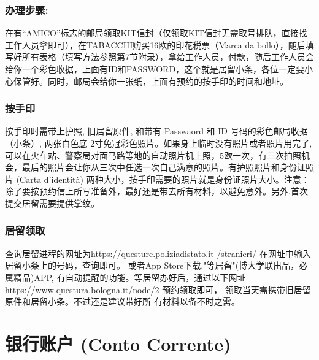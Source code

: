 \subsubsection{办理步骤:}
在有“AMICO”标志的邮局领取KIT信封（仅领取KIT信封无需取号排队，直接找工作人员拿即可），在TABACCHI购买16欧的印花税票（Marca da bollo），随后填写好所有表格（填写方法参照第7节附录），拿给工作人员，付款，随后工作人员会给你一个彩色收据，上面有ID和PASSWORD，这个就是居留小条，各位一定要小心保管好。同时，邮局会给你一张纸，上面有预约的按手印的时间和地址。


\subsubsection{按手印}
按手印时需带上护照, 旧居留原件, 和带有 Passwaord 和 ID 号码的彩色邮局收据（小条）, 两张白色底 2寸免冠彩色照片。如果身上临时没有照片或者照片用完了,可以在火车站、警察局对面马路等地的自动照片机上照，5欧一次，有三次拍照机会，最后的照片会让你从三次中任选一次自己满意的照片。有护照照片和身份证照片 (Carta d’identità)  两种大小，按手印需要的照片就是身份证照片大小。注意：除了要按预约信上所写准备外，最好还是带去所有材料，以避免意外。另外,首次提交居留需要提供掌纹。


\subsubsection{居留领取}
查询居留进程的网址为https://questure.poliziadistato.it /stranieri/ 在网址中输入居留小条上的号码，查询即可。
或者App Store下载,"等居留"(博大学联出品，必属精品)APP,
有自动提醒的功能。等居留办好后，通过以下网址https://www.questura.bologna.it/node/2 预约领取即可，
领取当天需携带旧居留原件和居留小条。不过还是建议带好所
有材料以备不时之需。


\section{银行账户 (Conto Corrente)}

